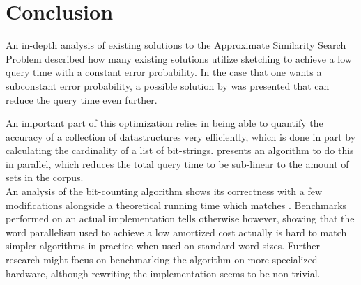 \section{Conclusion}
An in-depth analysis of existing solutions to the Approximate Similarity Search Problem described how many existing solutions utilize sketching to achieve a low query time with a constant error probability. In the case that one wants a subconstant error probability, a possible solution by \citet{fast-similarity-search} was presented that can reduce the query time even further.

An important part of this optimization relies in being able to quantify the accuracy of a collection of datastructures very efficiently, which is done in part by calculating the cardinality of a list of bit-strings. \citet{fast-similarity-search} presents an algorithm to do this in parallel, which reduces the total query time to be sub-linear to the amount of sets in the corpus.\\
An analysis of the bit-counting algorithm shows its correctness with a few modifications alongside a theoretical running time which matches \cite{fast-similarity-search}. Benchmarks performed on an actual implementation tells otherwise however, showing that the word parallelism used to achieve a low amortized cost actually is hard to match simpler algorithms in practice when used on standard word-sizes. Further research might focus on benchmarking the algorithm on more specialized hardware, although rewriting the implementation seems to be non-trivial.
